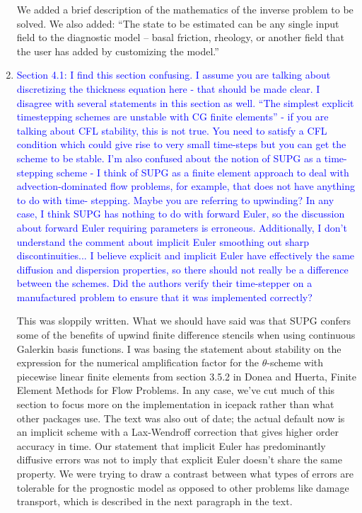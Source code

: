 \documentclass{article}
\theoremstyle{definition}
\theoremstyle{plain}
\begin{document}
\begin{enumerate}
We added a brief description of the mathematics of the inverse problem to be solved.
We also added: ``The state to be estimated can be any single input field to the diagnostic model -- basal friction, rheology, or another field that the user has added by customizing the model.''

\item \textcolor{blue}{Section 4.1: I find this section confusing. I assume you are talking about discretizing the thickness
equation here - that should be made clear. I disagree with several statements in this section as
well. ``The simplest explicit timestepping schemes are unstable with CG finite elements'' - if you are
talking about CFL stability, this is not true. You need to satisfy a CFL condition which could give
rise to very small time-steps but you can get the scheme to be stable. I'm also confused about the
notion of SUPG as a time-stepping scheme - I think of SUPG as a finite element approach to deal
with advection-dominated flow problems, for example, that does not have anything to do with time-
stepping. Maybe you are referring to upwinding? In any case, I think SUPG has nothing to do with
forward Euler, so the discussion about forward Euler requiring parameters is erroneous. Additionally,
I don't understand the comment about implicit Euler smoothing out sharp discontinuities... I believe
explicit and implicit Euler have effectively the same diffusion and dispersion properties, so there
should not really be a difference between the schemes. Did the authors verify their time-stepper on
a manufactured problem to ensure that it was implemented correctly?}

This was sloppily written.
What we should have said was that SUPG confers some of the benefits of upwind finite difference stencils when using continuous Galerkin basis functions.
I was basing the statement about stability on the expression for the numerical amplification factor for the $\theta$-scheme with piecewise linear finite elements from section 3.5.2 in Donea and Huerta, Finite Element Methods for Flow Problems.
In any case, we've cut much of this section to focus more on the implementation in icepack rather than what other packages use.
The text was also out of date; the actual default now is an implicit scheme with a Lax-Wendroff correction that gives higher order accuracy in time.
Our statement that implicit Euler has predominantly diffusive errors was not to imply that explicit Euler doesn't share the same property.
We were trying to draw a contrast between what types of errors are tolerable for the prognostic model as opposed to other problems like damage transport, which is described in the next paragraph in the text.


\end{enumerate}
\end{document}
